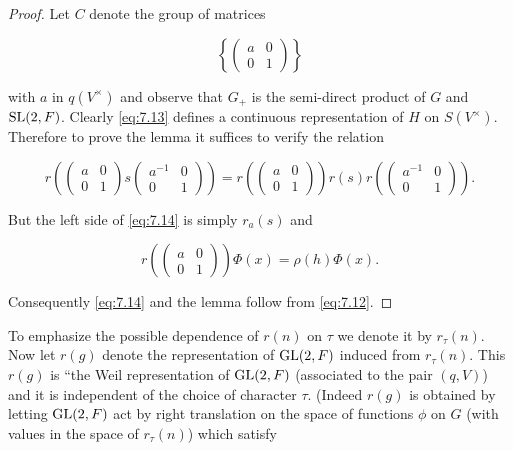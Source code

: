 \begin{proof}

Let $C$ denote the group of matrices

\[
\left\{\begin{pmatrix} a & 0 \\ 0 & 1 \end{pmatrix}\right\}
\]

with $a$ in $q(V^{\times})$ and observe that $G_+$ is the semi-direct product of $G$ and $\operatorname{SL}(2,F)$. Clearly \eqref{eq:7.13} defines a continuous representation of $H$ on $S(V^{\times})$. Therefore to prove the lemma it suffices to verify the relation

\begin{equation}\label{eq:7.14}
r\left(\begin{pmatrix} a & 0 \\ 0 & 1 \end{pmatrix} s \begin{pmatrix} a^{-1} & 0 \\ 0 & 1 \end{pmatrix}\right) = r\left(\begin{pmatrix} a & 0 \\ 0 & 1 \end{pmatrix}\right)r(s)r\left(\begin{pmatrix} a^{-1} & 0 \\ 0 & 1 \end{pmatrix}\right).\tag{7.14}
\end{equation}

But the left side of \eqref{eq:7.14} is simply $r_a(s)$ and

\[
r\left(\begin{pmatrix} a & 0 \\ 0 & 1 \end{pmatrix}\right)\Phi(x) = \rho(h)\Phi(x).
\]

Consequently \eqref{eq:7.14} and the lemma follow from \eqref{eq:7.12}.

\end{proof}

To emphasize the possible dependence of $r(n)$ on $\tau$ we denote it by $r_\tau(n)$. Now let $r(g)$ denote the representation of $\operatorname{GL}(2,F)$ induced from $r_\tau(n)$. This $r(g)$ is ``the Weil representation of $\operatorname{GL}(2,F)$ (associated to the pair $(q,V)$) and it is independent of the choice of character $\tau$. (Indeed $r(g)$ is obtained by letting $\operatorname{GL}(2,F)$ act by right translation on the space of functions $\phi$ on $G$ (with values in the space of $r_\tau(n)$) which satisfy

